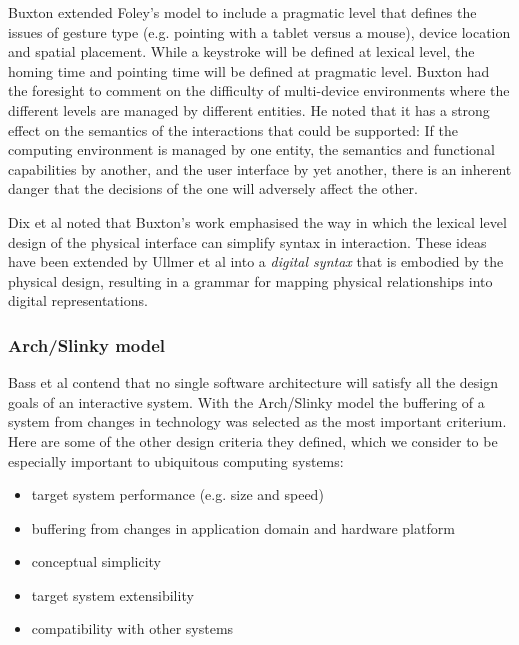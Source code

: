 	Buxton \cite{Buxton1983} extended Foley's model to include a pragmatic level that defines the issues of gesture type (e.g. pointing with a tablet versus a mouse), device location and spatial placement. While a keystroke will be defined at lexical level, the homing time and pointing time will be defined at pragmatic level. Buxton had the foresight to comment on the difficulty of multi-device environments where the different levels are managed by different entities. He noted that it has a strong effect on the semantics of the interactions that could be supported: If the computing environment is managed by one entity, the semantics and functional capabilities by another, and the user interface by yet another, there is an inherent danger that the decisions of the one will adversely affect the other. 
	
	Dix et al \cite{Dix2008} noted that Buxton's work emphasised the way in which the lexical level design of the physical interface can simplify syntax in interaction. These ideas have been extended by Ullmer et al \cite{Ullmer2005} into a \emph{digital syntax} that is embodied by the physical design, resulting in a grammar for mapping physical relationships into digital representations.
	
	
\subsubsection{Arch/Slinky model}
	
	Bass et al \cite{Bass1992} contend that no single software architecture will satisfy all the design goals of an interactive system. With the Arch/Slinky model the buffering of a system from changes in technology was selected as the most important criterium. Here are some of the other design criteria they defined, which we consider to be especially important to ubiquitous computing systems:
	
	\begin{itemize}
		\item target system performance (e.g. size and speed)
		\item 	buffering from changes in application domain and hardware platform
		\item 	conceptual simplicity
		\item 	target system extensibility
		\item 	compatibility with other systems
	\end{itemize}
	
